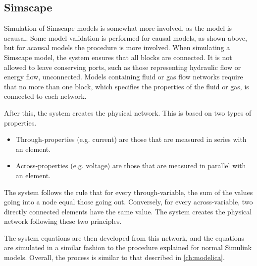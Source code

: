 \documentclass[\rootfolder/main.tex]{subfiles}
\begin{document}
\subsection{Simscape}

Simulation of Simscape models is somewhat more involved, as the model is acausal.
Some model validation is performed for causal models, as shown above, but for acausal models the procedure is more involved.
When simulating a Simscape model, the system ensures that all blocks are connected.
It is not allowed to leave conserving ports, such as those representing hydraulic flow or energy flow, unconnected.
Models containing fluid or gas flow networks require that no more than one block, which specifies the properties of the fluid or gas, is connected to each network.

After this, the system creates the physical network.
This is based on two types of properties.

\begin{itemize}
    \item Through-properties (e.g. current) are those that are measured in series with an element.
    \item Across-properties (e.g. voltage) are those that are measured in parallel with an element.
\end{itemize}

The system follows the rule that for every through-variable, the sum of the values going into a node equal those going out.
Conversely, for every across-variable, two directly connected elements have the same value.
The system creates the physical network following these two principles.

The system equations are then developed from this network, and the equations are simulated in a similar fashion to the procedure explained for normal Simulink models.
Overall, the process is similar to that described in \cref{ch:modelica}.
\end{document}
